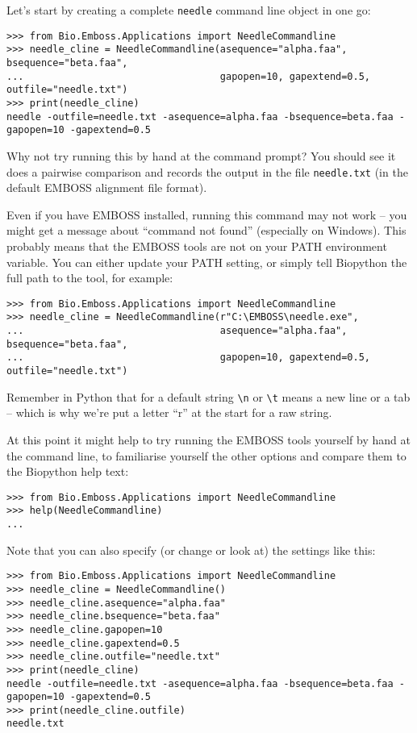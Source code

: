 \documentclass{report}
\begin{document}
Let's start by creating a complete \texttt{needle} command line object in one go:

\begin{verbatim}
>>> from Bio.Emboss.Applications import NeedleCommandline
>>> needle_cline = NeedleCommandline(asequence="alpha.faa", bsequence="beta.faa",
...                                  gapopen=10, gapextend=0.5, outfile="needle.txt")
>>> print(needle_cline)
needle -outfile=needle.txt -asequence=alpha.faa -bsequence=beta.faa -gapopen=10 -gapextend=0.5
\end{verbatim}

Why not try running this by hand at the command prompt? You should see it does a
pairwise comparison and records the output in the file \texttt{needle.txt} (in the
default EMBOSS alignment file format).

Even if you have EMBOSS installed, running this command may not work -- you
might get a message about ``command not found'' (especially on Windows). This
probably means that the EMBOSS tools are not on your PATH environment
variable. You can either update your PATH setting, or simply tell Biopython
the full path to the tool, for example:

\begin{verbatim}
>>> from Bio.Emboss.Applications import NeedleCommandline
>>> needle_cline = NeedleCommandline(r"C:\EMBOSS\needle.exe",
...                                  asequence="alpha.faa", bsequence="beta.faa",
...                                  gapopen=10, gapextend=0.5, outfile="needle.txt")
\end{verbatim}

\noindent Remember in Python that for a default string \verb|\n| or \verb|\t| means a
new line or a tab -- which is why we're put a letter ``r'' at the start for a raw string.

At this point it might help to try running the EMBOSS tools yourself by hand at the
command line, to familiarise yourself the other options and compare them to the
Biopython help text:

\begin{verbatim}
>>> from Bio.Emboss.Applications import NeedleCommandline
>>> help(NeedleCommandline)
...
\end{verbatim}

Note that you can also specify (or change or look at) the settings like this:

\begin{verbatim}
>>> from Bio.Emboss.Applications import NeedleCommandline
>>> needle_cline = NeedleCommandline()
>>> needle_cline.asequence="alpha.faa"
>>> needle_cline.bsequence="beta.faa"
>>> needle_cline.gapopen=10
>>> needle_cline.gapextend=0.5
>>> needle_cline.outfile="needle.txt"
>>> print(needle_cline)
needle -outfile=needle.txt -asequence=alpha.faa -bsequence=beta.faa -gapopen=10 -gapextend=0.5
>>> print(needle_cline.outfile)
needle.txt
\end{verbatim}
\end{document}
